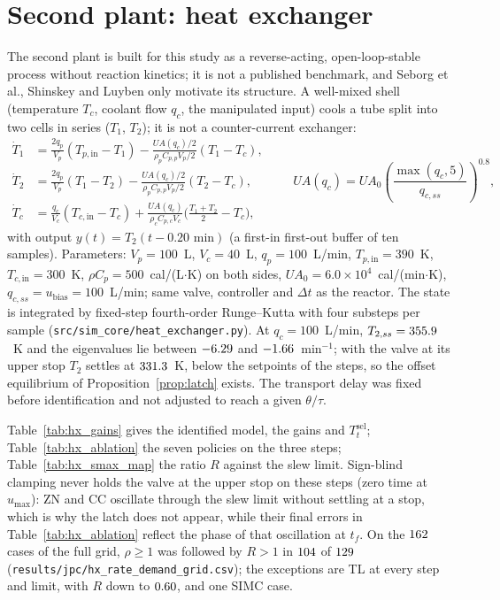 \documentclass[11pt]{article}
\begin{document}






\section{Second plant: heat exchanger}\label{supp:hx}
The second plant is built for this study as a reverse-acting, open-loop-stable process without reaction kinetics; it is not a published benchmark, and Seborg et al., Shinskey and Luyben only motivate its structure. A well-mixed shell (temperature $T_c$, coolant flow $q_c$, the manipulated input) cools a tube split into two cells in series ($T_1$, $T_2$); it is not a counter-current exchanger:
\begin{equation}
\begin{aligned}
\dot T_1 &= \tfrac{2q_p}{V_p}(T_{p,\mathrm{in}} - T_1) - \tfrac{UA(q_c)/2}{\rho_p C_{p,p} V_p/2}(T_1 - T_c), \\
\dot T_2 &= \tfrac{2q_p}{V_p}(T_1 - T_2) - \tfrac{UA(q_c)/2}{\rho_p C_{p,p} V_p/2}(T_2 - T_c), \\
\dot T_c &= \tfrac{q_c}{V_c}(T_{c,\mathrm{in}} - T_c) + \tfrac{UA(q_c)}{\rho_c C_{p,c} V_c}\bigl(\tfrac{T_1 + T_2}{2} - T_c\bigr),
\end{aligned}
\qquad UA(q_c) = UA_0\left(\frac{\max(q_c, 5)}{q_{c,ss}}\right)^{0.8},
\label{eq:hx}
\end{equation}
with output $y(t) = T_2(t - 0.20\text{ min})$ (a first-in first-out buffer of ten samples). Parameters: $V_p = 100$~L, $V_c = 40$~L, $q_p = 100$~L/min, $T_{p,\mathrm{in}} = 390$~K, $T_{c,\mathrm{in}} = 300$~K, $\rho C_p = 500$~cal/(L$\cdot$K) on both sides, $UA_0 = 6.0\times 10^4$~cal/(min$\cdot$K), $q_{c,ss} = u_{\text{bias}} = 100$~L/min; same valve, controller and $\Delta t$ as the reactor. The state is integrated by fixed-step fourth-order Runge--Kutta with four substeps per sample (\texttt{src/sim\_core/heat\_exchanger.py}). At $q_c = 100$~L/min, $T_{2,ss} = 355.9$~K and the eigenvalues lie between $-6.29$ and $-1.66$~min$^{-1}$; with the valve at its upper stop $T_2$ settles at $331.3$~K, below the setpoints of the steps, so the offset equilibrium of Proposition~\ref{prop:latch} exists. The transport delay was fixed before identification and not adjusted to reach a given $\theta/\tau$.

Table~\ref{tab:hx_gains} gives the identified model, the gains and $T_t^{\mathrm{sel}}$; Table~\ref{tab:hx_ablation} the seven policies on the three steps; Table~\ref{tab:hx_smax_map} the ratio $R$ against the slew limit. Sign-blind clamping never holds the valve at the upper stop on these steps (zero time at $u_{\max}$): ZN and CC oscillate through the slew limit without settling at a stop, which is why the latch does not appear, while their final errors in Table~\ref{tab:hx_ablation} reflect the phase of that oscillation at $t_f$. On the $162$ cases of the full grid, $\rho \ge 1$ was followed by $R > 1$ in $104$ of $129$ (\texttt{results/jpc/hx\_rate\_demand\_grid.csv}); the exceptions are TL at every step and limit, with $R$ down to $0.60$, and one SIMC case.
\end{document}

